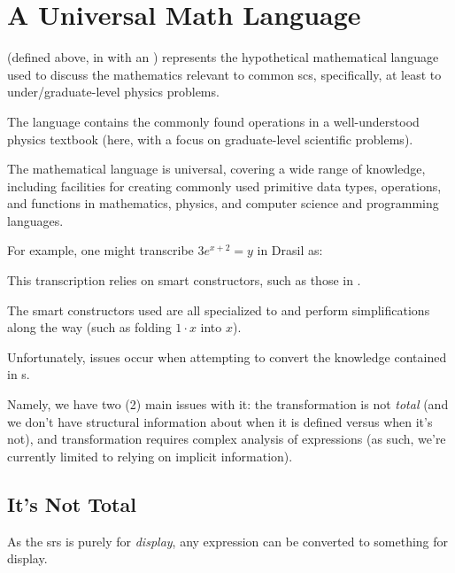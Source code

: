 \section{A Universal Math Language}
\label{sec:modelkinds:language}

\originalExprHaskell

\Expr{} (defined above, in  with an )
represents the hypothetical mathematical language used to discuss the
mathematics relevant to common \acs{scs}, specifically, at least to
under/graduate-level physics problems.

The language contains the commonly found operations in a well-understood physics
textbook (here, with a focus on graduate-level scientific problems).

The mathematical language is universal, covering a wide range of knowledge,
including facilities for creating commonly used primitive data types,
operations, and functions  in mathematics, physics, and computer science and
programming languages.

For example, one might transcribe \(3 e^{x + 2} = y\) in Drasil as:

\pseudoExampleExpression{}

This transcription relies on smart constructors, such as those in
.

The smart constructors used are all specialized to \Expr{} and perform
simplifications along the way (such as folding \(1 \cdot x\) into \(x\)).











Unfortunately, issues occur when attempting to convert the knowledge contained
in \RelationConcept{}s.

Namely, we have two (2) main issues with it: the transformation is not
\textit{total} (and we don't have structural information about when it is
defined versus when it's not), and transformation requires complex analysis of
expressions (as such, we're currently limited to relying on implicit
information).

\subsection{It's Not Total}

As the \acs{srs} is purely for \textit{display}, any \Expr{} expression can be
converted to something for display.


